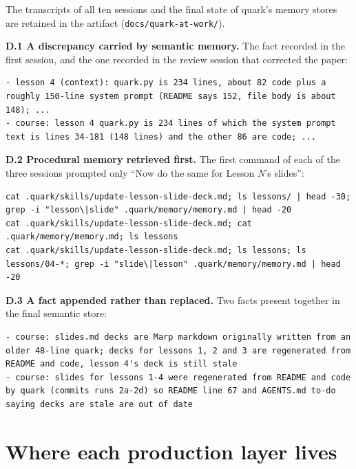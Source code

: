 The transcripts of all ten sessions and the final state of quark's memory stores are retained in the artifact (\passthrough{\lstinline!docs/quark-at-work/!}).

\textbf{D.1 A discrepancy carried by semantic memory.} The fact recorded in the first session, and the one recorded in the review session that corrected the paper:

\begin{lstlisting}
- lesson 4 (context): quark.py is 234 lines, about 82 code plus a roughly 150-line system prompt (README says 152, file body is about 148); ...
- course: lesson 4 quark.py is 234 lines of which the system prompt text is lines 34-181 (148 lines) and the other 86 are code; ...
\end{lstlisting}

\textbf{D.2 Procedural memory retrieved first.} The first command of each of the three sessions prompted only ``Now do the same for Lesson \emph{N}'s slides'':

\begin{lstlisting}
cat .quark/skills/update-lesson-slide-deck.md; ls lessons/ | head -30; grep -i "lesson\|slide" .quark/memory/memory.md | head -20
cat .quark/skills/update-lesson-slide-deck.md; cat .quark/memory/memory.md; ls lessons
cat .quark/skills/update-lesson-slide-deck.md; ls lessons; ls lessons/04-*; grep -i "slide\|lesson" .quark/memory/memory.md | head -20
\end{lstlisting}

\textbf{D.3 A fact appended rather than replaced.} Two facts present together in the final semantic store:

\begin{lstlisting}
- course: slides.md decks are Marp markdown originally written from an older 48-line quark; decks for lessons 1, 2 and 3 are regenerated from README and code, lesson 4's deck is still stale
- course: slides for lessons 1-4 were regenerated from README and code by quark (commits runs 2a-2d) so README line 67 and AGENTS.md to-do saying decks are stale are out of date
\end{lstlisting}

\section{Where each production layer lives}

